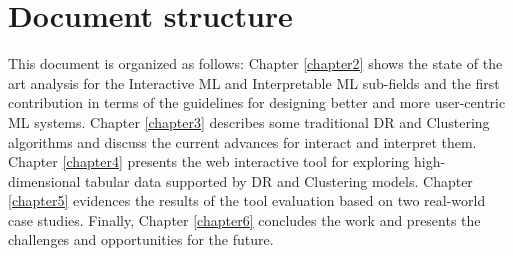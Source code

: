 \section{Document structure} %
\label{section1.2}

This document is organized as follows: Chapter \ref{chapter2} shows the state of the art analysis for the Interactive ML and Interpretable ML sub-fields and the first contribution in terms of the guidelines for designing better and more user-centric ML systems. Chapter \ref{chapter3} describes some traditional DR and Clustering algorithms and discuss the current advances for interact and interpret them. Chapter \ref{chapter4} presents the web interactive tool for exploring high-dimensional tabular data supported by DR and Clustering models. Chapter \ref{chapter5} evidences the results of the tool evaluation based on two real-world case studies. Finally, Chapter \ref{chapter6} concludes the work and presents the challenges and opportunities for the future.